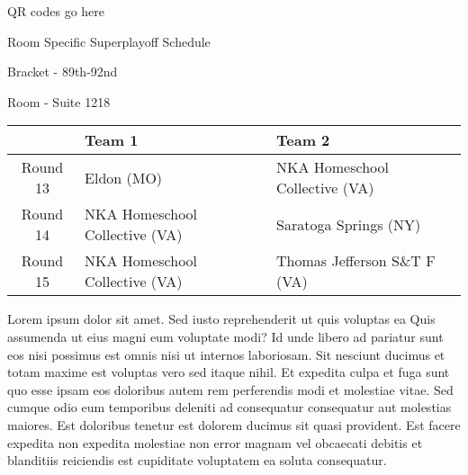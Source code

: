 \documentclass{article}%
\begin{document}
\vspace*{140pt}%
\begin{center}%
\begin{Huge}%
QR codes go here%
\end{Huge}%
\end{center}%
\newpage%
\begin{center}%
\begin{Huge}%
Room Specific Superplayoff Schedule%
\end{Huge}%
\vspace*{8pt}%
\linebreak%
\begin{Large}%
Bracket {-} 89th{-}92nd%
\end{Large}%
\vspace*{8pt}%
\linebreak%
\vspace*{8pt}%
\begin{Large}%
Room {-} Suite 1218%
\end{Large}%
\end{center}%
%
\begin{tabularx}{\textwidth}{|c|Y|Y|}%
\hline%
&Team 1&Team 2\\%
\hline%
Round 13&Eldon (MO)&NKA Homeschool Collective (VA)\\%
Round 14&NKA Homeschool Collective (VA)&Saratoga Springs (NY)\\%
Round 15&NKA Homeschool Collective (VA)&Thomas Jefferson S\&T F (VA)\\%
\hline%
\end{tabularx}%
\vspace*{8pt}%
\newline%
Lorem ipsum dolor sit amet. Sed iusto reprehenderit ut quis voluptas ea Quis assumenda ut eius magni eum voluptate modi? Id unde libero ad pariatur sunt eos nisi possimus est omnis nisi ut internos laboriosam. Sit nesciunt ducimus et totam maxime est voluptas vero sed itaque nihil. Et expedita culpa et fuga sunt quo esse ipsam eos doloribus autem rem perferendis modi et molestiae vitae.\newline%
\newline%
Sed cumque odio eum temporibus deleniti ad consequatur consequatur aut molestias maiores. Est doloribus tenetur est dolorem ducimus sit quasi provident. Est facere expedita non expedita molestiae non error magnam vel obcaecati debitis et blanditiis reiciendis est cupiditate voluptatem ea soluta consequatur.%
\vspace*{140pt}%
\end{document}
